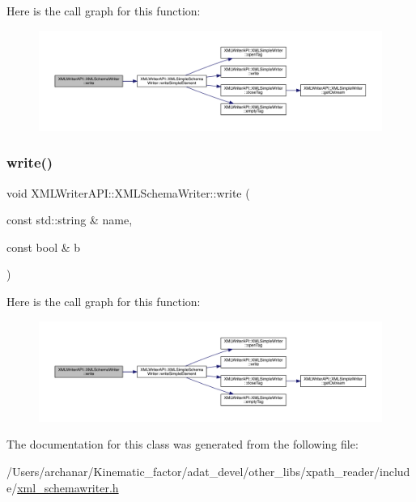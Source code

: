 Here is the call graph for this function\+:
\nopagebreak
\begin{figure}[H]
\begin{center}
\leavevmode
\includegraphics[width=350pt]{db/d34/classXMLWriterAPI_1_1XMLSchemaWriter_a0d6bf66ccbb217c4db704568f9c377fe_cgraph}
\end{center}
\end{figure}
\mbox{\label{classXMLWriterAPI_1_1XMLSchemaWriter_a0d6bf66ccbb217c4db704568f9c377fe}} 
\subsubsection{\texorpdfstring{write()}{write()}\hspace{0.1cm}{\footnotesize\ttfamily [10/10]}}
{\footnotesize\ttfamily void X\+M\+L\+Writer\+A\+P\+I\+::\+X\+M\+L\+Schema\+Writer\+::write (\begin{DoxyParamCaption}\item[{const std\+::string \&}]{name,  }\item[{const bool \&}]{b }\end{DoxyParamCaption})\hspace{0.3cm}{\ttfamily [inline]}}

Here is the call graph for this function\+:
\nopagebreak
\begin{figure}[H]
\begin{center}
\leavevmode
\includegraphics[width=350pt]{db/d34/classXMLWriterAPI_1_1XMLSchemaWriter_a0d6bf66ccbb217c4db704568f9c377fe_cgraph}
\end{center}
\end{figure}


The documentation for this class was generated from the following file\+:\begin{DoxyCompactItemize}
\item 
/\+Users/archanar/\+Kinematic\+\_\+factor/adat\+\_\+devel/other\+\_\+libs/xpath\+\_\+reader/include/\mbox{\hyperlink{other__libs_2xpath__reader_2include_2xml__schemawriter_8h}{xml\+\_\+schemawriter.\+h}}\end{DoxyCompactItemize}
